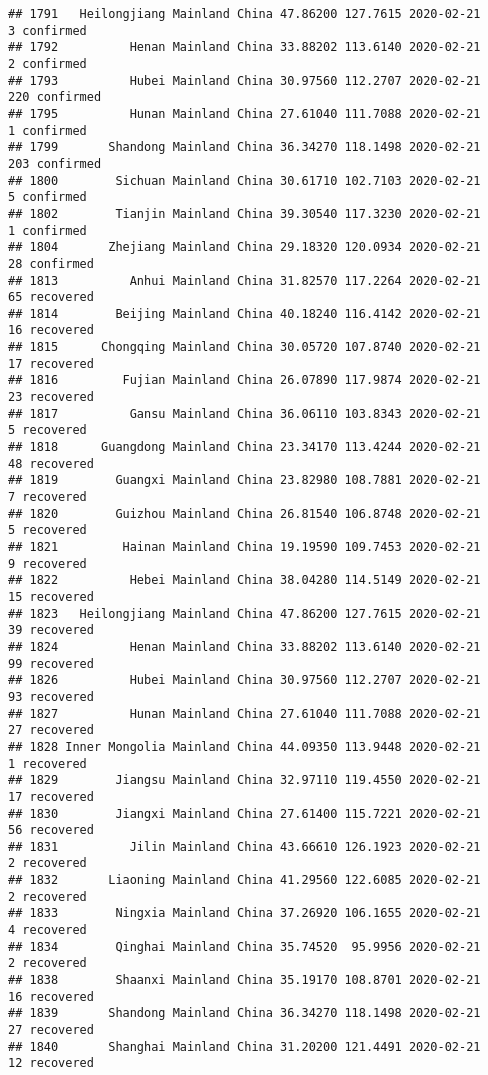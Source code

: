 \documentclass[
]{article}
\begin{document}
\begin{verbatim}
## 1791   Heilongjiang Mainland China 47.86200 127.7615 2020-02-21     3 confirmed
## 1792          Henan Mainland China 33.88202 113.6140 2020-02-21     2 confirmed
## 1793          Hubei Mainland China 30.97560 112.2707 2020-02-21   220 confirmed
## 1795          Hunan Mainland China 27.61040 111.7088 2020-02-21     1 confirmed
## 1799       Shandong Mainland China 36.34270 118.1498 2020-02-21   203 confirmed
## 1800        Sichuan Mainland China 30.61710 102.7103 2020-02-21     5 confirmed
## 1802        Tianjin Mainland China 39.30540 117.3230 2020-02-21     1 confirmed
## 1804       Zhejiang Mainland China 29.18320 120.0934 2020-02-21    28 confirmed
## 1813          Anhui Mainland China 31.82570 117.2264 2020-02-21    65 recovered
## 1814        Beijing Mainland China 40.18240 116.4142 2020-02-21    16 recovered
## 1815      Chongqing Mainland China 30.05720 107.8740 2020-02-21    17 recovered
## 1816         Fujian Mainland China 26.07890 117.9874 2020-02-21    23 recovered
## 1817          Gansu Mainland China 36.06110 103.8343 2020-02-21     5 recovered
## 1818      Guangdong Mainland China 23.34170 113.4244 2020-02-21    48 recovered
## 1819        Guangxi Mainland China 23.82980 108.7881 2020-02-21     7 recovered
## 1820        Guizhou Mainland China 26.81540 106.8748 2020-02-21     5 recovered
## 1821         Hainan Mainland China 19.19590 109.7453 2020-02-21     9 recovered
## 1822          Hebei Mainland China 38.04280 114.5149 2020-02-21    15 recovered
## 1823   Heilongjiang Mainland China 47.86200 127.7615 2020-02-21    39 recovered
## 1824          Henan Mainland China 33.88202 113.6140 2020-02-21    99 recovered
## 1826          Hubei Mainland China 30.97560 112.2707 2020-02-21    93 recovered
## 1827          Hunan Mainland China 27.61040 111.7088 2020-02-21    27 recovered
## 1828 Inner Mongolia Mainland China 44.09350 113.9448 2020-02-21     1 recovered
## 1829        Jiangsu Mainland China 32.97110 119.4550 2020-02-21    17 recovered
## 1830        Jiangxi Mainland China 27.61400 115.7221 2020-02-21    56 recovered
## 1831          Jilin Mainland China 43.66610 126.1923 2020-02-21     2 recovered
## 1832       Liaoning Mainland China 41.29560 122.6085 2020-02-21     2 recovered
## 1833        Ningxia Mainland China 37.26920 106.1655 2020-02-21     4 recovered
## 1834        Qinghai Mainland China 35.74520  95.9956 2020-02-21     2 recovered
## 1838        Shaanxi Mainland China 35.19170 108.8701 2020-02-21    16 recovered
## 1839       Shandong Mainland China 36.34270 118.1498 2020-02-21    27 recovered
## 1840       Shanghai Mainland China 31.20200 121.4491 2020-02-21    12 recovered

\end{verbatim}
\end{document}
